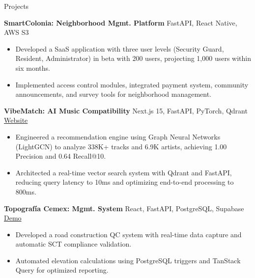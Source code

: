 \documentclass{resume}
\begin{document}
\begin{rSection}{Projects}

\textbf{SmartColonia: Neighborhood Mgmt. Platform} {FastAPI, React Native, AWS S3} \hfill 
\begin{itemize}
    \item Developed a SaaS application with three user levels (Security Guard, Resident, Administrator) in beta with 200 users, projecting 1,000 users within six months.
    \item Implemented access control modules, integrated payment system, community announcements, and survey tools for neighborhood management.
\end{itemize}

\textbf{VibeMatch: AI Music Compatibility} {Next.js 15, FastAPI, PyTorch, Qdrant} \hfill \href{https://www.vibematchs.me/}{Website}
\begin{itemize}
    \item Engineered a recommendation engine using Graph Neural Networks (LightGCN) to analyze 338K+ tracks and 6.9K artists, achieving 1.00 Precision and 0.64 Recall@10.
    \item Architected a real-time vector search system with Qdrant and FastAPI, reducing query latency to 10ms and optimizing end-to-end processing to 800ms.
\end{itemize}

\textbf{Topografía Cemex: Mgmt. System} {React, FastAPI, PostgreSQL, Supabase} \hfill \href{https://topografia-two.vercel.app/}{Demo}
\begin{itemize}
    \item Developed a road construction QC system with real-time data capture and automatic SCT compliance validation.
    \item Automated elevation calculations using PostgreSQL triggers and TanStack Query for optimized reporting.
\end{itemize}

\end{rSection}
\end{document}
